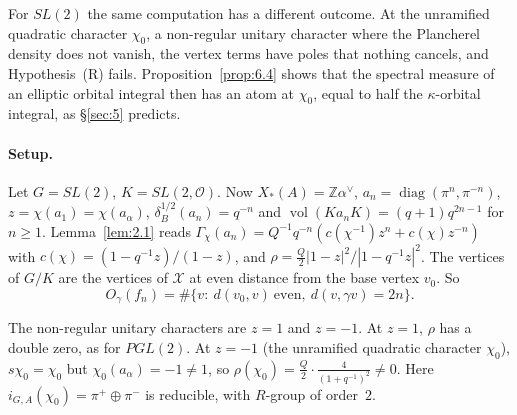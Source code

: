 \documentclass[12pt,letterpaper]{article}
\numberwithin{equation}{section}
\theoremstyle{plain}
\theoremstyle{remark}
\theoremstyle{plain}
\theoremstyle{definition}
\theoremstyle{remark}
\theoremstyle{remark}
\newcommand{\OO}{\mathcal{O}}
\DeclareMathOperator{\vol}{vol}
\DeclareMathOperator{\diag}{diag}
\begin{document}
For $SL(2)$ the same computation has a different outcome. At the unramified quadratic character $\chi_0$, a non-regular unitary character where the Plancherel density does not vanish, the vertex terms have poles that nothing cancels, and Hypothesis~(R) fails. Proposition~\ref{prop:6.4} shows that the spectral measure of an elliptic orbital integral then has an atom at $\chi_0$, equal to half the $\kappa$-orbital integral, as \S\ref{sec:5} predicts.


\paragraph{Setup.} Let $G=SL(2)$, $K=SL(2,\OO)$. Now $X_*(A)=\mathbb{Z}\alpha^\vee$, $a_n=\diag(\pi^n,\pi^{-n})$, $z=\chi(a_1)=\chi(a_\alpha)$, $\delta_B^{1/2}(a_n)=q^{-n}$ and $\vol(Ka_nK)=(q+1)q^{2n-1}$ for $n\ge1$. Lemma~\ref{lem:2.1} reads $\Gamma_\chi(a_n)=Q^{-1}q^{-n}(c(\chi^{-1})z^n+c(\chi)z^{-n})$ with $c(\chi)=(1-q^{-1}z)/(1-z)$, and $\rho=\frac Q2|1-z|^2/|1-q^{-1}z|^2$. The vertices of $G/K$ are the vertices of $\mathcal X$ at even distance from the base vertex $v_0$. So
\[
O_\gamma(f_n)=\#\{v:\ d(v_0,v)\ \text{even},\ d(v,\gamma v)=2n\}.
\]

The non-regular unitary characters are $z=1$ and $z=-1$. At $z=1$, $\rho$ has a double zero, as for $PGL(2)$. At $z=-1$ (the unramified quadratic character $\chi_0$), $s\chi_0=\chi_0$ but $\chi_0(a_\alpha)=-1\ne1$, so $\rho(\chi_0)=\frac Q2\cdot\frac{4}{(1+q^{-1})^2}\ne0$. Here $i_{G,A}(\chi_0)=\pi^+\oplus\pi^-$ is reducible, with $R$-group of order~$2$.
\end{document}

